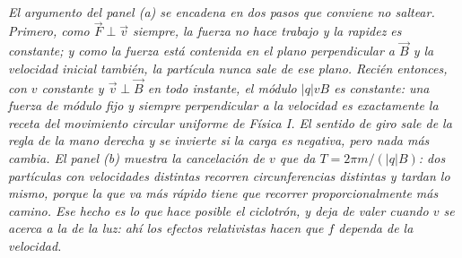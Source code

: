 \begin{center}
\\[0.5em]
{\small\itshape El argumento del panel (a) se encadena en dos pasos que conviene
no saltear. Primero, como $\vec F \perp \vec v$ siempre, la fuerza no hace
trabajo y la \emph{rapidez} es constante; y como la fuerza está contenida en el
plano perpendicular a $\vec B$ y la velocidad inicial también, la partícula
nunca sale de ese plano. Recién entonces, con $v$ constante y
$\vec v \perp \vec B$ en todo instante, el módulo $|q|vB$ es constante: una
fuerza de módulo fijo y siempre perpendicular a la velocidad es exactamente la
receta del movimiento circular uniforme de Física I. El sentido de giro sale de
la regla de la mano derecha y se invierte si la carga es negativa, pero nada más
cambia. El panel (b) muestra la cancelación de $v$ que da
$T = 2\pi m/(|q|B)$: dos partículas con velocidades distintas recorren
circunferencias distintas y tardan lo mismo, porque la que va más rápido tiene
que recorrer proporcionalmente más camino. Ese hecho es lo que hace posible el
ciclotrón, y deja de valer cuando $v$ se acerca a la de la luz: ahí los efectos
relativistas hacen que $f$ dependa de la velocidad.}
\end{center}
